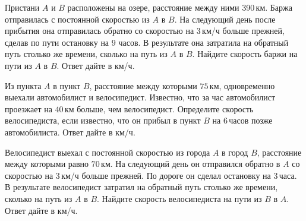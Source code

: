 \begin{class}[number=1]
\begin{listofex}
		\item Пристани \( A \) и \( B \) расположены на озере, расстояние между ними 390 км. Баржа отправилась с постоянной скоростью из \( A \) в \( B \). На следующий день после прибытия она отправилась обратно со скоростью на \( 3 \) км/ч больше прежней, сделав по пути остановку на \( 9 \) часов. В результате она затратила на обратный путь столько же времени, сколько на путь из \( A \) в \( B \). Найдите скорость баржи на пути из \( A \) в \( B \). Ответ дайте в км/ч.
		\item Из пункта \( A \) в пункт \( B \), расстояние между которыми \( 75 \) км, одновременно выехали автомобилист и велосипедист. Известно, что за час автомобилист проезжает на \( 40 \) км больше, чем велосипедист. Определите скорость велосипедиста, если известно, что он прибыл в пункт \( B \) на \( 6 \) часов позже автомобилиста. Ответ дайте в км/ч.
		\item Велосипедист выехал с постоянной скоростью из города \( A \) в город \( B \), расстояние между которыми равно \( 70 \) км. На следующий день он отправился обратно в \( A \) со скоростью на \( 3 \) км/ч больше прежней. По дороге он сделал остановку на \( 3 \) часа. В результате велосипедист затратил на обратный путь столько же времени, сколько на путь из \( A \) в \( B \). Найдите скорость велосипедиста на пути из \( B \) в \( A \). Ответ дайте в км/ч.
	\end{listofex}
\end{class}
%
%
%
%
%
%
%
